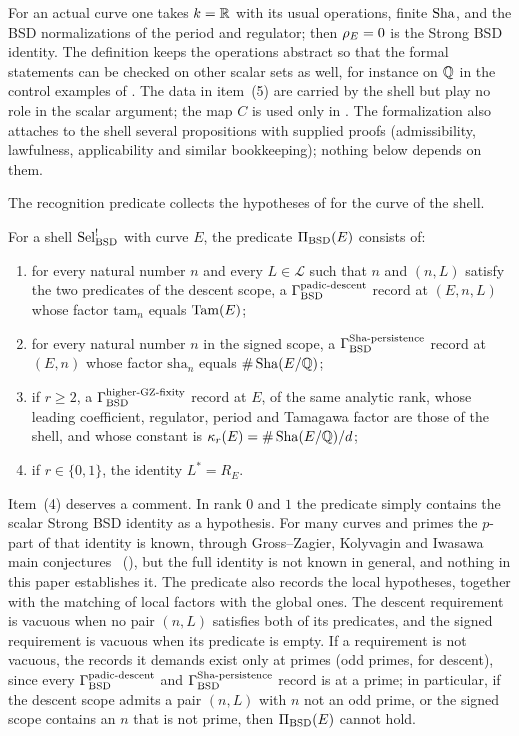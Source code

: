 For an actual curve one takes $k=\mathbb{R}$ with its usual operations, finite
$\operatorname{Sha}$, and the BSD normalizations of the period and regulator; then
$\rho_E=0$ is the Strong BSD identity.  The definition keeps the
operations abstract so that the formal statements can be checked on
other scalar sets as well, for instance on $\mathbb{Q}$ in the control examples
of .  The data in item~(5) are carried by the shell but
play no role in the scalar argument; the map $C$ is used only in
.  The formalization also attaches
to the shell several propositions with supplied proofs (admissibility,
lawfulness, applicability and similar bookkeeping); nothing below depends
on them.

The recognition predicate collects the hypotheses of
 for the curve of the shell.

\begin{definition}\label{def:closure:pi-bsd}
For a shell $\mathrm{Sel}^{!}_{\mathrm{BSD}}$ with curve $E$, the predicate $\Pi_{\mathrm{BSD}}(E)$ consists
of:
\begin{enumerate}
\item for every natural number $n$ and every $L\in\mathcal L$ such that
  $n$ and $(n,L)$ satisfy the two predicates of the descent scope, a
  $\Gamma_{\mathrm{BSD}}^{\mathrm{padic\text{-}descent}}$ record at $(E,n,L)$ whose factor $\mathrm{tam}_n$ equals
  $\operatorname{Tam}(E)$;
\item for every natural number $n$ in the signed scope, a $\Gamma_{\mathrm{BSD}}^{\mathrm{Sha\text{-}persistence}}$
  record at $(E,n)$ whose factor $\mathrm{sha}_n$ equals
  $\#\operatorname{Sha}(E/\mathbb{Q})$;
\item if $r\ge2$, a $\Gamma_{\mathrm{BSD}}^{\mathrm{higher\text{-}GZ\text{-}fixity}}$ record at $E$, of the same analytic rank,
  whose leading coefficient, regulator, period and Tamagawa factor are
  those of the shell, and whose constant is
  $\kappa_r(E)=\#\operatorname{Sha}(E/\mathbb{Q})/d$;
\item if $r\in\{0,1\}$, the identity $L^*=R_E$.
\end{enumerate}
\end{definition}

Item~(4) deserves a comment.  In rank $0$ and $1$ the predicate simply
contains the scalar Strong BSD identity as a hypothesis.  For many curves
and primes the $p$-part of that identity is known, through
Gross--Zagier, Kolyvagin and Iwasawa main
conjectures~\citep{GrossZagier1986,Kolyvagin1989,SkinnerUrban2014}
(), but the full identity is not known in general,
and nothing in this paper establishes it.  The predicate also records the local hypotheses, together with the
matching of local factors with the global ones.  The descent requirement
is vacuous when no pair $(n,L)$ satisfies both of its predicates, and the
signed requirement is vacuous when its predicate is empty.  If a
requirement is not vacuous, the records it demands exist only at primes
(odd primes, for descent), since every $\Gamma_{\mathrm{BSD}}^{\mathrm{padic\text{-}descent}}$ and $\Gamma_{\mathrm{BSD}}^{\mathrm{Sha\text{-}persistence}}$ record
is at a prime; in particular, if the descent scope admits a pair $(n,L)$
with $n$ not an odd prime, or the signed scope contains an $n$ that is not
prime, then $\Pi_{\mathrm{BSD}}(E)$ cannot hold.

